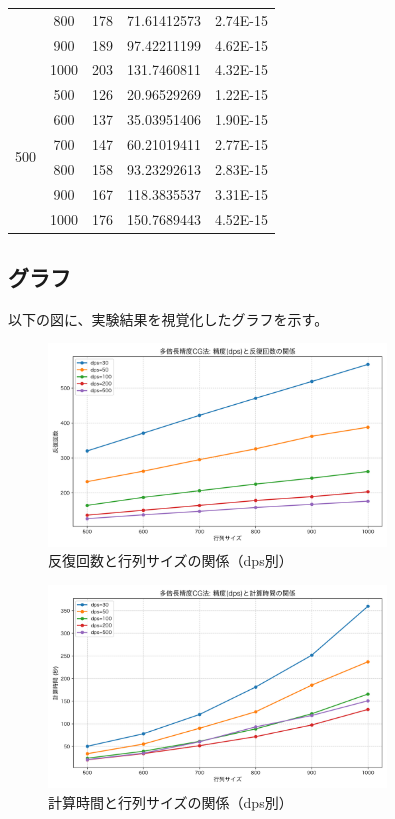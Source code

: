 \documentclass{article}
\begin{document}
\begin{table}[h!]
\begin{tabular}{|c|c|c|c|c|}
        & 800 & 178 & 71.61412573 & 2.74E-15 \\
        & 900 & 189 & 97.42211199 & 4.62E-15 \\
        & 1000 & 203 & 131.7460811 & 4.32E-15 \\
        \midrule
        \multirow{6}{*}{500} & 500 & 126 & 20.96529269 & 1.22E-15 \\
        & 600 & 137 & 35.03951406 & 1.90E-15 \\
        & 700 & 147 & 60.21019411 & 2.77E-15 \\
        & 800 & 158 & 93.23292613 & 2.83E-15 \\
        & 900 & 167 & 118.3835537 & 3.31E-15 \\
        & 1000 & 176 & 150.7689443 & 4.52E-15 \\
        \bottomrule
    \end{tabular}
\end{table}

\subsection{グラフ}
以下の図に、実験結果を視覚化したグラフを示す。

\begin{figure}[H]
    \centering
    \includegraphics[width=0.8\textwidth]{mpmath_iterations_plot.png}
    \caption{反復回数と行列サイズの関係（dps別）}
    \label{fig:iterations_vs_dim}
\end{figure}

\begin{figure}[H]
    \centering
    \includegraphics[width=0.8\textwidth]{mpmath_time_plot.png}
    \caption{計算時間と行列サイズの関係（dps別）}
    \label{fig:time_vs_dim}
\end{figure}
\end{document}
